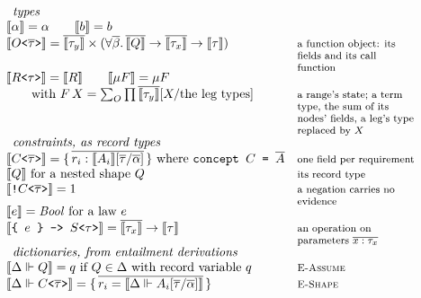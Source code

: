 \begin{figure}[htbp]
\[
\begin{array}{@{}l@{\quad}l@{}}
\multicolumn{2}{l}{\textit{types}} \\
\llbracket \alpha \rrbracket = \alpha \qquad \llbracket b \rrbracket = b & \\
\llbracket O\texttt{<}\overline{\tau}\texttt{>} \rrbracket = \overline{\llbracket \tau_y \rrbracket} \times (\forall\overline{\beta}.\,\overline{\llbracket Q \rrbracket} \to \overline{\llbracket \tau_x \rrbracket} \to \llbracket \tau \rrbracket) & \note{a function object: its fields and its call function} \\
\llbracket R\texttt{<}\tau\texttt{>} \rrbracket = \llbracket R \rrbracket \qquad \llbracket \mu F \rrbracket = \mu F & \\
\qquad \text{with } F\,X = \textstyle\sum_{O} \prod \overline{\llbracket \tau_y \rrbracket}[X / \text{the leg types}] & \note{a range's state; a term type, the sum of its nodes' fields, a leg's type replaced by $X$} \\[6pt]
\multicolumn{2}{l}{\textit{constraints, as record types}} \\
\llbracket C\texttt{<}\overline{\tau}\texttt{>} \rrbracket = \{\,\overline{r_i : \llbracket A_i \rrbracket[\overline{\tau}/\overline{\alpha}]}\,\} \text{ where } \texttt{concept } C \texttt{ = } \overline{A} & \note{one field per requirement} \\
\llbracket Q \rrbracket \text{ for a nested shape } Q & \note{its record type} \\
\llbracket \texttt{!}C\texttt{<}\overline{\tau}\texttt{>} \rrbracket = 1 & \note{a negation carries no evidence} \\
\llbracket e \rrbracket = \mathit{Bool} \text{ for a law } e & \\
\llbracket \texttt{\{ }e\texttt{ \} -> }S\texttt{<}\tau\texttt{>} \rrbracket = \overline{\llbracket \tau_x \rrbracket} \to \llbracket \tau \rrbracket & \note{an operation on parameters $\overline{x : \tau_x}$} \\[6pt]
\multicolumn{2}{l}{\textit{dictionaries, from entailment derivations}} \\
\llbracket \Delta \Vdash Q \rrbracket = q \text{ if } Q \in \Delta \text{ with record variable } q & \note{\textsc{E-Assume}} \\
\llbracket \Delta \Vdash C\texttt{<}\overline{\tau}\texttt{>} \rrbracket = \{\,\overline{r_i = \llbracket \Delta \Vdash A_i[\overline{\tau}/\overline{\alpha}] \rrbracket}\,\} & \note{\textsc{E-Shape}} \\

\end{array}\]
\end{figure}
